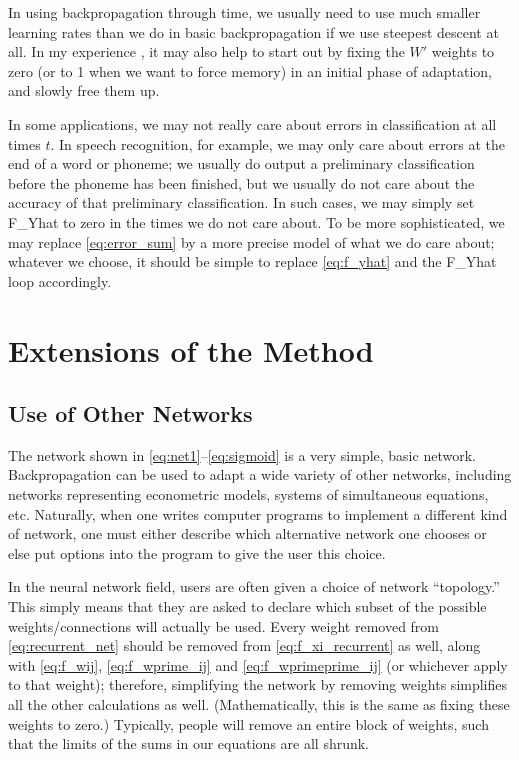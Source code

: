 \documentclass[journal]{IEEEtran} %
\begin{document}
In using backpropagation through time, we usually need to use much smaller learning rates than we do in basic backpropagation if we use steepest descent at all. In my experience \cite{Werbos:1987c}, it may also help to start out by fixing the $W'$ weights to zero (or to 1 when we want to force memory) in an initial phase of adaptation, and slowly free them up.

In some applications, we may not really care about errors in classification at all times $t$. In speech recognition, for example, we may only care about errors at the end of a word or phoneme; we usually do output a preliminary classification before the phoneme has been finished, but we usually do not care about the accuracy of that preliminary classification. In such cases, we may simply set F\_Yhat to zero in the times we do not care about. To be more sophisticated, we may replace \eqref{eq:error_sum} by a more precise model of what we do care about; whatever we choose, it should be simple to replace \eqref{eq:f_yhat} and the F\_Yhat loop accordingly.

\section{Extensions of the Method}
\label{sec:extensions}
\subsection{Use of Other Networks}
The network shown in \eqref{eq:net1}--\eqref{eq:sigmoid} is a very simple, basic network. Backpropagation can be used to adapt a wide variety of other networks, including networks representing econometric models, systems of simultaneous equations, etc. Naturally, when one writes computer programs to implement a different kind of network, one must either describe which alternative network one chooses or else put options into the program to give the user this choice.

In the neural network field, users are often given a choice of network ``topology.'' This simply means that they are asked to declare which subset of the possible weights/connections will actually be used. Every weight removed from \eqref{eq:recurrent_net} should be removed from \eqref{eq:f_xi_recurrent} as well, along with \eqref{eq:f_wij}, \eqref{eq:f_wprime_ij} and \eqref{eq:f_wprimeprime_ij} (or whichever apply to that weight); therefore, simplifying the network by removing weights simplifies all the other calculations as well. (Mathematically, this is the same as fixing these weights to zero.) Typically, people will remove an entire block of weights, such that the limits of the sums in our equations are all shrunk.
\end{document}
